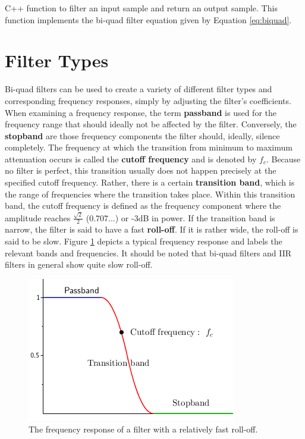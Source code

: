 \begin{table}[h!]
  \caption{C++ function to filter an input sample and return an output sample. This function implements the bi-quad filter equation given by Equation \ref{eq:biquad}.}
  \label{code:filter}
\end{table}

\pagebreak

\section{Filter Types}

Bi-quad filters can be used to create a variety of different filter types and corresponding frequency responses, simply by adjusting the filter's coefficients. When examining a frequency response, the term \textbf{passband} is used for the frequency range that should ideally not be affected by the filter. Conversely, the \textbf{stopband} are those frequency components the filter should, ideally, silence completely. The frequency at which the transition from minimum to maximum attenuation occurs is called the \textbf{cutoff frequency} and is denoted by $f_{c}$. Because no filter is perfect, this transition usually does not happen precisely at the specified cutoff frequency. Rather, there is a certain \textbf{transition band}, which is the range of frequencies where the transition takes place. Within this transition band, the cutoff frequency is defined as the frequency component where the amplitude reaches $\frac{\sqrt{2}}{2}$ (0.707...) or -3dB in power\footnotemark. If the transition band is narrow, the filter is said to have a fast \textbf{roll-off}. If it is rather wide, the roll-off is said to be slow.  Figure \ref{fig:filterterm} depicts a typical frequency response and labels the relevant bands and frequencies. It should be noted that bi-quad filters and IIR filters in general show quite slow roll-off.


\begin{figure}[h!]
  \includegraphics[scale=0.7]{img/filterterm}
  \caption{The frequency response of a filter with a relatively fast roll-off.}
  \label{fig:filterterm}
\end{figure}

